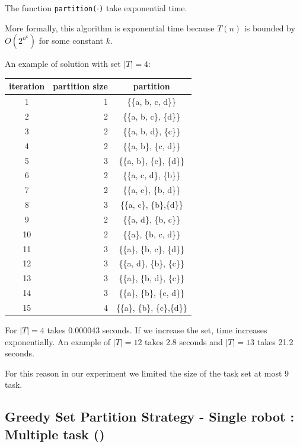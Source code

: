 The function \texttt{partition($\cdot$)} take exponential time. 

More formally, this algorithm is exponential time because $T(n)$ is bounded by $O(2^{n^{k}})$ 
for some constant $k$.

\newpage
An example of solution with set $|T| = 4$:
\begin{center}
  \begin{tabular}{|c|r|c|} \hline
  \textbf{iteration} & \textbf{partition size} & \textbf{partition} \\ \hline
  1    & 1    & \{\{a, b, c, d\}\}   \\
  2    & 2    & \{\{a, b, c\}, \{d\}\}   \\
  3    & 2    & \{\{a, b, d\}, \{c\}\}   \\
  4    & 2    & \{\{a, b\}, \{c, d\}\}   \\
  5    & 3    & \{\{a, b\}, \{c\}, \{d\}\}   \\
  6    & 2    & \{\{a, c, d\}, \{b\}\}   \\
  7    & 2    & \{\{a, c\}, \{b, d\}\}   \\
  8    & 3    & \{\{a, c\}, \{b\},\{d\}\}   \\
  9    & 2    & \{\{a, d\}, \{b, c\}\}   \\
  10   & 2    & \{\{a\}, \{b, c, d\}\}   \\
  11   & 3    & \{\{a\}, \{b, c\}, \{d\}\}   \\
  12   & 3    & \{\{a, d\}, \{b\}, \{c\}\}   \\
  13   & 3    & \{\{a\}, \{b, d\}, \{c\}\}   \\
  14   & 3    & \{\{a\}, \{b\}, \{c, d\}\}   \\
  15   & 4    & \{\{a\}, \{b\}, \{c\},\{d\}\}   \\ \hline       
  \end{tabular}
\end{center}

For $|T| = 4$ takes 0.000043 seconds. If we increase the set, time increases exponentially.
An example of $|T| = 12$ takes 2.8 seconds and $|T| = 13$ takes 21.2 seconds.

For this reason in our experiment we limited the size of the task set at most 9 task.

\subsection{Greedy Set Partition Strategy - Single robot : Multiple task (\gsp)}

